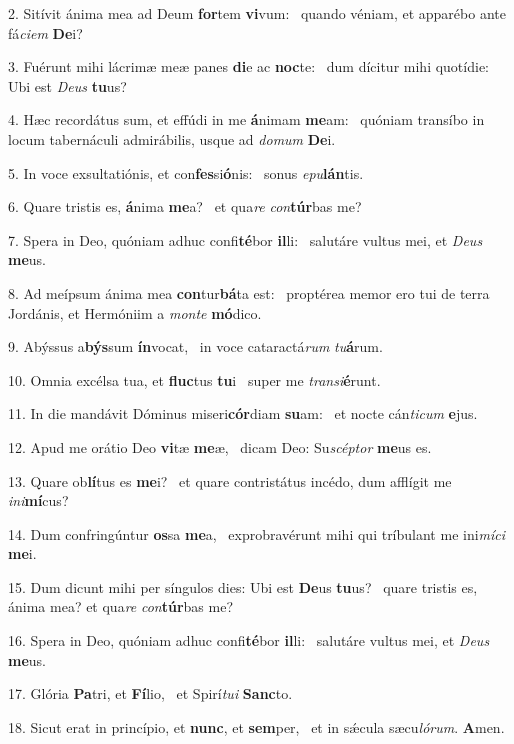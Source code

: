 2. Sitívit ánima mea ad Deum \textbf{for}tem \textbf{vi}vum: \ast\  quando véniam, et apparébo ante fá\textit{ci}\textit{em} \textbf{De}i?\

3. Fuérunt mihi lácrimæ meæ panes \textbf{di}e ac \textbf{noc}te: \ast\  dum dícitur mihi quotídie: Ubi est \textit{De}\textit{us} \textbf{tu}us?\

4. Hæc recordátus sum, et effúdi in me \textbf{á}nimam \textbf{me}am: \ast\  quóniam transíbo in locum tabernáculi admirábilis, usque ad \textit{do}\textit{mum} \textbf{De}i.\

5. In voce exsultatiónis, et con\textbf{fes}si\textbf{ó}nis: \ast\  sonus \textit{e}\textit{pu}\textbf{lán}tis.\

6. Quare tristis es, \textbf{á}nima \textbf{me}a? \ast\  et qua\textit{re} \textit{con}\textbf{túr}bas me?\

7. Spera in Deo, quóniam adhuc confi\textbf{té}bor \textbf{il}li: \ast\  salutáre vultus mei, et \textit{De}\textit{us} \textbf{me}us.\

8. Ad meípsum ánima mea \textbf{con}tur\textbf{bá}ta est: \ast\  proptérea memor ero tui de terra Jordánis, et Hermóniim a \textit{mon}\textit{te} \textbf{mó}dico.\

9. Abýssus a\textbf{býs}sum \textbf{ín}vocat, \ast\  in voce cataractá\textit{rum} \textit{tu}\textbf{á}rum.\

10. Omnia excélsa tua, et \textbf{fluc}tus \textbf{tu}i \ast\  super me \textit{trans}\textit{i}\textbf{é}runt.\

11. In die mandávit Dóminus miseri\textbf{cór}diam \textbf{su}am: \ast\  et nocte cán\textit{ti}\textit{cum} \textbf{e}jus.\

12. Apud me orátio Deo \textbf{vi}tæ \textbf{me}æ, \ast\  dicam Deo: Su\textit{scép}\textit{tor} \textbf{me}us es.\

13. Quare ob\textbf{lí}tus es \textbf{me}i? \ast\  et quare contristátus incédo, dum afflígit me \textit{in}\textit{i}\textbf{mí}cus?\

14. Dum confringúntur \textbf{os}sa \textbf{me}a, \ast\  exprobravérunt mihi qui tríbulant me ini\textit{mí}\textit{ci} \textbf{me}i.\

15. Dum dicunt mihi per síngulos dies: Ubi est \textbf{De}us \textbf{tu}us? \ast\  quare tristis es, ánima mea? et qua\textit{re} \textit{con}\textbf{túr}bas me?\

16. Spera in Deo, quóniam adhuc confi\textbf{té}bor \textbf{il}li: \ast\  salutáre vultus mei, et \textit{De}\textit{us} \textbf{me}us.\

17. Glória \textbf{Pa}tri, et \textbf{Fí}lio, \ast\  et Spirí\textit{tu}\textit{i} \textbf{Sanc}to.\

18. Sicut erat in princípio, et \textbf{nunc}, et \textbf{sem}per, \ast\  et in sǽcula sæcu\textit{ló}\textit{rum}. \textbf{A}men.\

